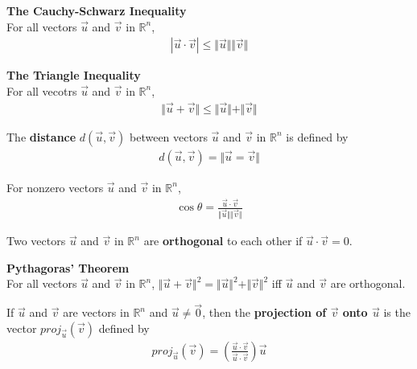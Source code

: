 \documentclass{article}
\begin{document}
\begin{theorem}
    \textbf{The Cauchy-Schwarz Inequality}\\
    For all vectors $\vec u$ and $\vec v$ in $\mathbb{R}^n$,
    \begin{gather*}
        |\vec u \cdot \vec v| \leq \Vert \vec u \Vert \Vert \vec v \Vert
    \end{gather*}
\end{theorem}
\begin{theorem}
    \textbf{The Triangle Inequality}\\
    For all vecotrs $\vec u$ and $\vec v$ in $\mathbb{R}^n$,
    \begin{gather*}
        \Vert \vec u + \vec v \Vert \leq \Vert \vec u \Vert + \Vert \vec v \Vert
    \end{gather*}
\end{theorem}
\begin{definition}
    The \textbf{distance} $d(\vec u, \vec v)$ between vectors $\vec u$ and $\vec v$ in $\mathbb{R}^n$ is defined by
    \begin{gather*}
        d(\vec u, \vec v) = \Vert \vec u = \vec v \Vert
    \end{gather*}
\end{definition}
\begin{definition}
    For nonzero vectors $\vec u$ and $\vec v$ in $\mathbb{R}^n$,
    \begin{gather*}
        \cos\theta = \frac{\vec u \cdot \vec v}{\Vert \vec u \Vert \Vert \vec v\Vert}
    \end{gather*}
\end{definition}
\begin{definition}
    Two vectors $\vec u$ and $\vec v$ in $\mathbb{R}^n$ are \textbf{orthogonal} to each other if $\vec u \cdot \vec v = 0$.
\end{definition}
\begin{theorem}
    \textbf{Pythagoras' Theorem}\\
    For all vectors $\vec u$ and $\vec v$ in $\mathbb{R}^n$, $\Vert \vec u + \vec v\Vert^2 = \Vert \vec u \Vert^2 + \Vert \vec v \Vert ^2$ iff $\vec u$ and $\vec v$ are orthogonal.
\end{theorem}
\begin{definition}
    If $\vec u$ and $\vec v$ are vectors in $\mathbb{R}^n$ and $\vec u \not= \vec 0$, then the \textbf{projection of $\vec v$ onto $\vec u$} is the vector $proj_{\vec u}(\vec v)$ defined by
    \begin{gather*}
        proj_{\vec u}(\vec v) = \left(\frac{\vec u \cdot \vec v}{\vec u \cdot \vec v}\right)\vec u
    \end{gather*}
\end{definition}
\end{document}
